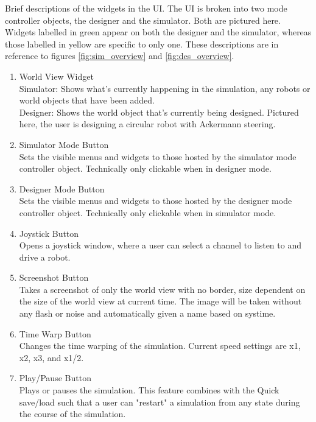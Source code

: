 Brief descriptions of the widgets in the UI. The UI is broken into two mode controller objects, the designer and the simulator. Both are pictured here. Widgets labelled in green appear on both the designer and the simulator, whereas those labelled in yellow are specific to only one. These descriptions are in reference to figures \ref{fig:sim_overview} and \ref{fig:des_overview}.
 \begin{enumerate}
 	\item World View Widget\\
 	Simulator: Shows what's currently happening in the simulation, any robots or world objects that have been added.\\
 	Designer: Shows the world object that's currently being designed. Pictured here, the user is designing a circular robot with Ackermann steering.\\
 	\item Simulator Mode Button\\
 	Sets the visible menus and widgets to those hosted by the simulator mode controller object. Technically only clickable when in designer mode.\\
 	\item Designer Mode Button\\
 	Sets the visible menus and widgets to those hosted by the designer mode controller object. Technically only clickable when in simulator mode.\\
 	\item Joystick Button\\
 	Opens a joystick window, where a user can select a channel to listen to and drive a robot.\\
 	\item Screenshot Button\\
 	Takes a screenshot of only the world view with no border, size dependent on the size of the world view at current time. The image will be taken without any flash or noise and automatically given a name based on systime.\\
 	\item Time Warp Button\\
 	Changes the time warping of the simulation. Current speed settings are x1, x2, x3, and x1/2.\\
 	\item Play/Pause Button\\
 	Plays or pauses the simulation. This feature combines with the Quick save/load such that a user can "restart" a simulation from any state during the course of the simulation.\\

\end{enumerate}
